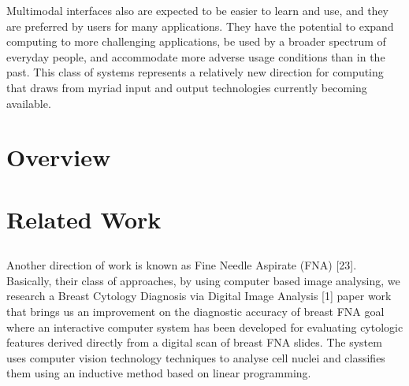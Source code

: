 Multimodal interfaces also are expected to be easier to learn and use, and they are preferred by users for many applications. They have the potential to expand computing to more challenging applications, be used by a broader spectrum of everyday people, and accommodate more adverse usage conditions than in the past. This class of systems represents a relatively new direction for computing that draws from myriad input and output technologies currently becoming available.

\section{Overview}



\section{}



%
%

\section{Related Work}



\subsection{}



\subsection{}

Another direction of work is known as Fine Needle Aspirate (FNA) [23]. Basically, their class of approaches, by using computer based image analysing, we research a Breast Cytology Diagnosis via Digital Image Analysis [1] paper work that brings us an improvement on the diagnostic accuracy of breast FNA goal where an interactive computer system has been developed for evaluating cytologic features derived directly from a digital scan of breast FNA slides. The system uses computer vision technology techniques to analyse cell nuclei and classifies them using an inductive method based on linear programming.

